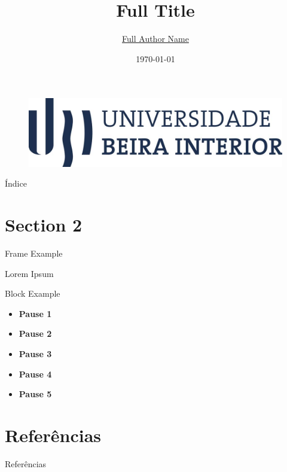 \documentclass{beamer}
\author[Abv. Author Name]{\href{}{Full Author Name}}
\institute[UBI]{\href{}{Unit Class, Course}}
\title[Short Title]{Full Title}
\subtitle[\shortconference]{\fullconference}
\date[Month 20XX]{\small \today}
\begin{document}
{

\begin{frame}\label{start}
  \titlepage
  \begin{figure}
    \includegraphics[scale=0.15]{style/logo_ubi_vhorizontalB.jpg}
  \end{figure}
\end{frame}
}

\begin{frame}{Índice}
  \tableofcontents[sectionstyle=show, subsectionstyle=show/shaded/hide, subsubsectionstyle=show/shaded/hide]
\end{frame}


\section{Section 2}

\begin{frame}{Frame Example}

  Lorem Ipsum

  \begin{block}{Block Example}
    \begin{itemize}
      \pause
      \item \textbf{Pause 1}
            \pause
      \item \textbf{Pause 2}
            \pause
      \item \textbf{Pause 3}
            \pause
      \item \textbf{Pause 4}
            \pause
      \item \textbf{Pause 5}
    \end{itemize}
  \end{block}

\end{frame}


\section{Referências}

\begin{frame}[allowframebreaks]{Referências}

  \hyperlink{start}{}
  \nocite{numpy}
  \nocite{scipy}
  \nocite{plt}
  
  


\end{frame}
\end{document}
